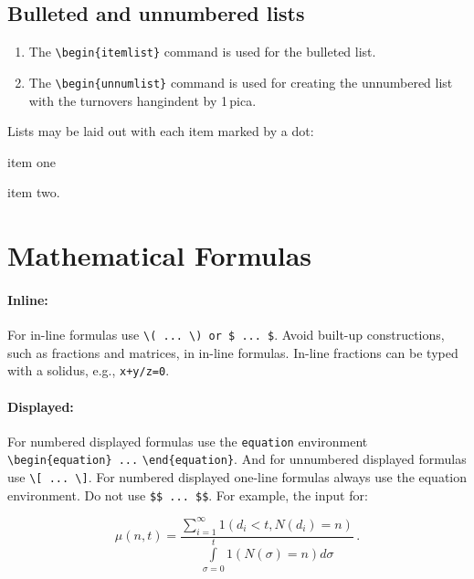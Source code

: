 \subsection{Bulleted and unnumbered lists}

\begin{enumerate}
\item[] The \verb|\begin{itemlist}| command is used for the bulleted list.

\smallskip

\item[] The \verb|\begin{unnumlist}| command is used for creating the
  unnumbered list with the turnovers hangindent by 1\,pica.
\end{enumerate}

Lists may be laid out with each item marked by a dot:

\begin{itemlist}
\item item one
\item item two.
\end{itemlist}

\section{Mathematical Formulas}
\paragraph{Inline:}
For in-line formulas use \verb|\( ... \) or $ ... $|. Avoid built-up
constructions, such as fractions and matrices, in in-line
formulas. In-line fractions can be typed with a solidus, e.g.,
\verb|x+y/z=0|.

\paragraph{Displayed:}
For numbered displayed formulas use the \verb|equation| environment
\verb|\begin{equation} ...| \verb|\end{equation}|.
And for unnumbered displayed formulas use \verb|\[ ... \]|. For
numbered displayed one-line formulas always use the equation
environment. Do not use \verb|$$ ... $$|. For example, the input
for:

\begin{equation}
\mu(n, t) = \frac{\sum\limits^\infty_{i=1}1 (d_i < t, N(d_i) = n)}
{\int\limits^t_{\sigma=0}1(N(\sigma)=n)d\sigma}\,. \label{eq1.1}
\end{equation}

